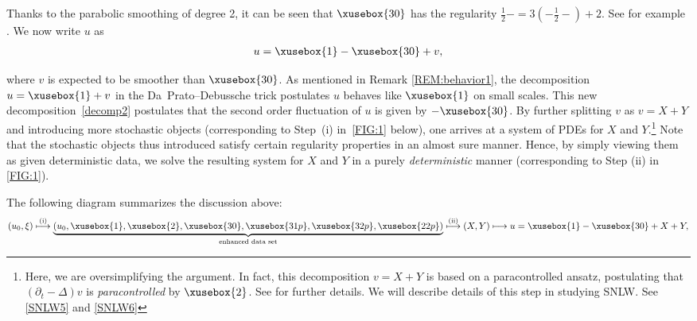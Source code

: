 \documentclass[%
11pt,  reqno]{amsart}
\def\<#1>{\xusebox{#1}}
\newcommand{\1}{\hspace{0.2mm}\text{I}\hspace{0.2mm}}
\newcommand{\noi}{\noindent}
\newcommand{\Dl}{\Delta}
\newcommand{\dt}{\partial_t}
\numberwithin{equation}{section}
\numberwithin{theorem}{section}
\begin{document}
\noi
Thanks to the parabolic smoothing of degree 2, 
it can be seen that $\<30>$ has the regularity $\frac 12- = 3(-\frac 12-) + 2$.
See for example \cite{MWX}.
We now write  $u$ as 
\begin{align}
u = \<1> - \<30> + v, 
\label{decomp2}
\end{align}

\noi
where $v$ is expected to be smoother than $\<30>$.
As mentioned in Remark \ref{REM:behavior1},
 the decomposition $u = \<1> + v$ in the Da~Prato--Debussche trick 
 postulates $u$ behaves like $\<1>$ on small scales.
This new  decomposition~\eqref{decomp2}
postulates that the second order fluctuation of $u$
is given by $-\<30>$.
By further splitting $v$
as $v = X + Y$
and introducing more stochastic objects (corresponding to Step~(i) in~\eqref{FIG:1} below),   
one arrives at a system of PDEs
for $X$ and $Y$.\footnote{Here, we are oversimplifying the argument.
In fact, this decomposition $v = X + Y$ is based on a paracontrolled ansatz,
postulating that $(\dt - \Dl)v$ is {\it paracontrolled} by $\<2>$.
See \cite{CC, MW1} for further details.
We will describe details of this step 
in studying SNLW.
See \eqref{SNLW5} and \eqref{SNLW6}
}
Note that 
the  stochastic objects thus introduced 
satisfy certain regularity properties in an almost sure manner.
Hence, by simply viewing them  as given deterministic data,
 we solve the resulting system for $X$ and $Y$
in a purely {\it deterministic} manner (corresponding to Step (ii) in \eqref{FIG:1}).


The following diagram summarizes the discussion above:
\begin{align} (u_0, \xi) \stackrel{\tiny \text{(i)}}{\longmapsto} \underbrace{(u_0, \<1>, \<2>, \<30>, \<31p>, \<32p>, \<22p>)}_{\text{enhanced data set}} 
\stackrel{\tiny \text{(ii)}}{\longmapsto}   (X, Y) \longmapsto  u = \<1>- \<30> + X+Y, 
\label{FIG:1}
\end{align}
\end{document}
